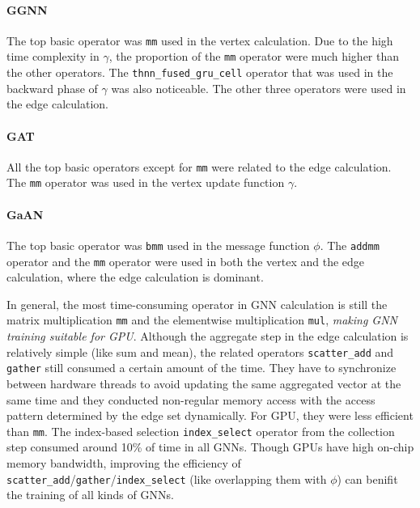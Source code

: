 \paragraph{GGNN}
The top basic operator was \texttt{mm} used in the vertex calculation.
Due to the high time complexity in $\gamma$, the proportion of the \texttt{mm} operator were much higher than the other operators.
The \texttt{thnn\_fused\_gru\_cell} operator that was used in the backward phase of $\gamma$ was also noticeable.
The other three operators were used in the edge calculation.

\paragraph{GAT}
All the top basic operators except for \texttt{mm} were related to the edge calculation.
The \texttt{mm} operator was used in the vertex update function $\gamma$.

\paragraph{GaAN}
The top basic operator was \texttt{bmm} used in the message function $\phi$.
The \texttt{addmm} operator and the \texttt{mm} operator were used in both the vertex and the edge calculation, where the edge calculation is dominant.

In general, the most time-consuming operator in GNN calculation is still the matrix multiplication \texttt{mm} and the elementwise multiplication \texttt{mul}, \emph{making GNN training suitable for GPU}.
Although the aggregate step in the edge calculation is relatively simple (like sum and mean), the related operators \texttt{scatter\_add} and \texttt{gather} still consumed a certain amount of the time.
They have to synchronize between hardware threads to avoid updating the same aggregated vector at the same time and they conducted non-regular memory access with the access pattern determined by the edge set dynamically.
For GPU, they were less efficient than \texttt{mm}.
The index-based selection \texttt{index\_select} operator from the collection step consumed around 10\% of time in all GNNs.
Though GPUs have high on-chip memory bandwidth, improving the efficiency of \texttt{scatter\_add}/\texttt{gather}/\texttt{index\_select} (like overlapping them with $\phi$) can benifit the training of all kinds of GNNs.

